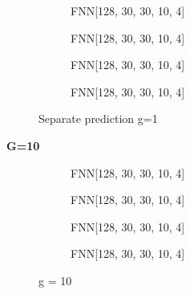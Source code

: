 \documentclass[a4paper,times,12pt]{article}
\begin{document}
\begin{figure}[H]
    \centering
    \begin{subfigure}[t]{0.45\textwidth}
		\centering
        
        \caption{FNN[128, 30, 30, 10, 4]}
		\label{fig:a}
    \end{subfigure}\hfill
    \begin{subfigure}[t]{0.45\textwidth}
		\centering
        
        \caption{FNN[128, 30, 30, 10, 4]}
		\label{fig:b}
    \end{subfigure}\hfill    
    \begin{subfigure}[t]{0.45\textwidth}
        \centering
        
        \caption{FNN[128, 30, 30, 10, 4]}
		\label{fig:c}
    \end{subfigure}\hfill
    \begin{subfigure}[t]{0.45\textwidth}
        \centering
        
        \caption{FNN[128, 30, 30, 10, 4]}
		\label{fig:c}
    \end{subfigure}
	\caption{Separate prediction  g=1}
\end{figure}

\textbf{G=10}

\begin{figure}[H]
    \centering
    \begin{subfigure}[t]{0.45\textwidth}
		\centering
        
        \caption{FNN[128, 30, 30, 10, 4]}
		\label{fig:a}
    \end{subfigure}\hfill
    \begin{subfigure}[t]{0.45\textwidth}
		\centering
        
        \caption{FNN[128, 30, 30, 10, 4]}
		\label{fig:b}
    \end{subfigure}\hfill    
    \begin{subfigure}[t]{0.45\textwidth}
        \centering
        
        \caption{FNN[128, 30, 30, 10, 4]}
		\label{fig:c}
    \end{subfigure}\hfill
    \begin{subfigure}[t]{0.45\textwidth}
        \centering
        
        \caption{FNN[128, 30, 30, 10, 4]}
		\label{fig:c}
    \end{subfigure}
	\caption{g = 10}
\end{figure}
\end{document}
